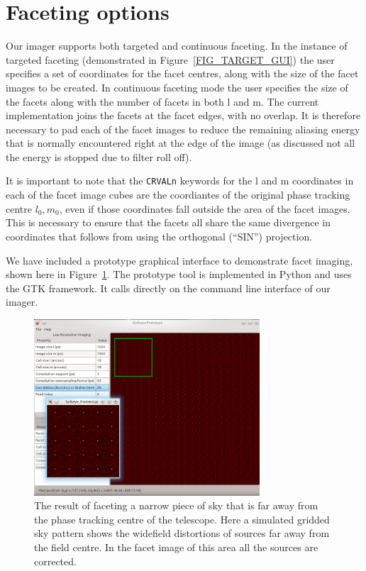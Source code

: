\section{Faceting options}
Our imager supports both targeted and continuous faceting. In the instance of targeted faceting (demonstrated in Figure~\ref{FIG_TARGET_GUI}) the user specifies a set of coordinates 
for the facet centres, along with the size of the facet images to be created. In continuous faceting mode the user specifies the size of the facets along with the number of facets in
both l and m. The current implementation joins the facets at the facet edges, with no overlap. It is therefore necessary to pad each of the facet images to
reduce the remaining aliasing energy that is normally encountered right at the edge of the image (as discussed not all the energy is stopped due to filter roll off).

It is important to note that the \texttt{CRVALn} keywords for the l and m coordinates in each of the facet image cubes are the coordiantes of the original phase tracking centre $l_0,m_0$, even
if those coordinates fall outside the area of the facet images. This is necessary to ensure that the facets all share the same divergence in coordinates that follows from using the 
orthogonal (``SIN'') projection.

We have included a prototype graphical interface to demonstrate facet imaging, shown here in Figure~\ref{FIG_TARGETED_FACETING}. The prototype tool is implemented in Python and uses the GTK
framework. It calls directly on the command line interface of our imager.
\begin{figure}[ht!]
 \begin{mdframed}
  \centering
  \includegraphics[width=0.75\textwidth]{images/targeted_faceting.png}
  \caption[Targeted faceting in action]{The result of faceting a narrow piece of sky that is far away from the phase tracking centre of the telescope. Here a simulated gridded sky pattern
  shows the widefield distortions of sources far away from the field centre. In the facet image of this area all the sources are corrected.}
  \label{FIG_TARGETED_FACETING}
 \end{mdframed}
\end{figure}

